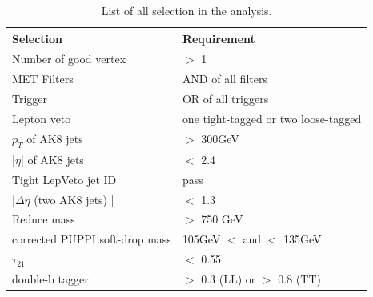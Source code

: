 \begin{table}[h!]
  \begin{center}
    \begin{tabular}{ll}
    Selection & Requirement \\
    \hline
    Number of good vertex & $>$ 1 \\
    MET Filters & AND of all filters\\
	Trigger & OR of all triggers\\
	Lepton veto & one tight-tagged or two loose-tagged \\
    $p_{T}$ of AK8 jets & $>$ 300GeV \\
	|$\eta$| of AK8 jets & $<$ 2.4 \\
	Tight LepVeto jet ID & pass \\
	|$\Delta \eta $ (two AK8 jets) | & $<$ 1.3 \\
	Reduce mass & $>$ 750 GeV \\
	corrected PUPPI soft-drop mass & 105GeV $<$ and $<$ 135GeV \\
	$\tau _{21}$ & $<$ 0.55 \\
	double-b tagger & $>$ 0.3 (LL) or $>$ 0.8 (TT)\\
	\hline
    \end{tabular}
  \end{center}

  \caption{List of all selection in the analysis.}
\end{table} 

